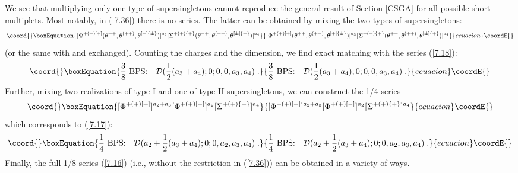 \documentclass[a4paper,12pt]{article}
\begin{document}
We see that multiplying only one type of supersingletons cannot 
reproduce the general result of Section \ref{CSGA} for all 
possible short multiplets. Most notably, in (\ref{7.36}) there is 
no \coordHE{} series. The latter can be obtained  by mixing the two 
types of supersingletons: 
\begin{equation}\coord{}\boxEquation{\label{7.37}
[\Phi^{+(+)[+]}(\theta^{++},\theta^{(++)},\theta^{[+]\{\pm\}})]^{a_3} 
[\Sigma^{+(+)\{+\}}(\theta^{++},\theta^{(++)},\theta^{[\pm]\{+\}})]^{a_4}
}{[\Phi^{+(+)[+]}(\theta^{++},\theta^{(++)},\theta^{[+]\{\pm\}})]^{a_3} 
[\Sigma^{+(+)\{+\}}(\theta^{++},\theta^{(++)},\theta^{[\pm]\{+\}})]^{a_4}
}{ecuacion}\coordE{}\end{equation}
(or the same with \myHighlight{$\Phi$}\coordHE{} and \myHighlight{$\Sigma$}\coordHE{} exchanged). Counting the 
charges and the dimension, we find exact matching with the series 
(\ref{7.18}):
\begin{equation}\coord{}\boxEquation{\label{7.37''}
 {3\over 8}  \mbox{ BPS:} \quad {\cal D}({1\over 2}(a_3+a_4);0;0,0,a_3,a_4)\;.  
}{{3\over 8}  \mbox{ BPS:} \quad {\cal D}({1\over 2}(a_3+a_4);0;0,0,a_3,a_4)\;.  
}{ecuacion}\coordE{}\end{equation}
Further, mixing two realizations of type I and one of type II 
supersingletons, we can construct the 1/4 series 
\begin{equation}\coord{}\boxEquation{\label{7.38}
   [\Phi^{+(+)[+]}]^{a_2+a_3}[\Phi^{+(+)[-]}]^{a_2}
[\Sigma^{+(+)\{+\}}]^{a_4} 
}{[\Phi^{+(+)[+]}]^{a_2+a_3}[\Phi^{+(+)[-]}]^{a_2}
[\Sigma^{+(+)\{+\}}]^{a_4} 
}{ecuacion}\coordE{}\end{equation}
which corresponds to (\ref{7.17}):
\begin{equation}\coord{}\boxEquation{\label{7.37'''}
 {1\over 4}  \mbox{ BPS:} \quad 
{\cal D}(a_2 + {1\over 2}(a_3+a_4);0;0,a_2,a_3,a_4)\;.  
}{{1\over 4}  \mbox{ BPS:} \quad 
{\cal D}(a_2 + {1\over 2}(a_3+a_4);0;0,a_2,a_3,a_4)\;.  
}{ecuacion}\coordE{}\end{equation} Finally, the full 1/8 series 
(\ref{7.16}) (i.e., without the restriction \coordHE{} 
in (\ref{7.36})) can be obtained in a variety of ways. 
\end{document}
